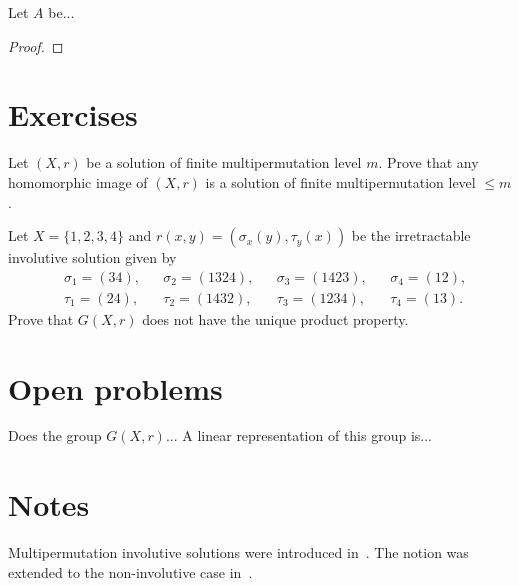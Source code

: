 \begin{theorem}
    Let $A$ be...
\end{theorem}

\begin{proof}

\end{proof}

\section*{Exercises}

\begin{prob}
\label{prob:bounded_mpl}
    Let $(X,r)$ be a solution of finite multipermutation level $m$. Prove that any homomorphic image of $(X,r)$ 
    is a solution of finite multipermutation level $\leq m$. 
\end{prob}

\begin{prob}
	\label{prob:4-13}
	Let $X=\{1,2,3,4\}$ and $r(x,y)=(\sigma_x(y),\tau_y(x))$ be the irretractable involutive solution given by
	\begin{align*}
		&\sigma_1=(34), && \sigma_2=(1324), && \sigma_3=(1423), && \sigma_4=(12),\\
		&\tau_1=(24), &&\tau_2=(1432), && \tau_3=(1234), && \tau_4=(13).
	\end{align*}
	Prove that $G(X,r)$ 
	does not have the unique product property.
\end{prob}

\section*{Open problems}

\begin{problem}
    Does the group $G(X,r)$...
    A linear representation of this group is...
\end{problem}

\section*{Notes}

Multipermutation involutive solutions were introduced in~\cite{MR1722951}. 
The notion was extended to the non-involutive case in~\cite{MR3974961}. 

